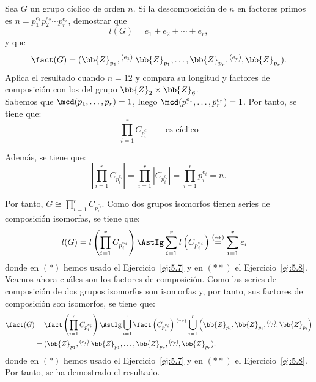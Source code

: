 \begin{ejercicio}\label{ej:5.9}
    Sea $G$ un grupo cíclico de orden $n$. Si la descomposición de $n$ en factores primos es $n = p_1^{e_1} p_2^{e_2} \cdots p_r^{e_r}$, demostrar que
    \[
        l(G) = e_1 + e_2 + \cdots + e_r,
    \]
    y que
    \[
        \fact(G) = (\bb{Z}_{p_1}, \stackrel{(e_1)}{\ldots}\bb{Z}_{p_1}, \dots, \bb{Z}_{p_r},\stackrel{(e_r)}{\ldots}, \bb{Z}_{p_r}).
    \]
    Aplica el resultado cuando $n = 12$ y compara su longitud y factores de composición con los del grupo $\bb{Z}_2 \times \bb{Z}_6$.\\

    Sabemos que $\mcd(p_1,\dots,p_r)=1$, luego $\mcd(p_1^{e_1},\dots,p_r^{e_r})=1$. Por tanto, se tiene que:
    \begin{equation*}
        \prod_{i=1}^{r} C_{p_i^{e_i}}\qquad \text{es cíclico}
    \end{equation*}

    Además, se tiene que:
    \begin{equation*}
        \left|\prod_{i=1}^{r} C_{p_i^{e_i}}\right| = \prod_{i=1}^{r} |C_{p_i^{e_i}}| = \prod_{i=1}^{r} p_i^{e_i} = n.
    \end{equation*}

    Por tanto, $G\cong \prod_{i=1}^{r} C_{p_i^{e_i}}$. Como dos grupos isomorfos tienen series de composición isomorfas, se tiene que:
    \begin{align*}
        l(G) &= l\left(\prod_{i=1}^{r} C_{p_i^{e_i}}\right) 
        \AstIg \sum_{i=1}^{r} l\left(C_{p_i^{e_i}}\right) 
        \stackrel{(\ast\ast)}{=} \sum_{i=1}^{r} e_i
    \end{align*}
    donde en $(\ast)$ hemos usado el Ejercicio~\ref{ej:5.7} y en $(\ast\ast)$ el Ejercicio~\ref{ej:5.8}.\\

    Veamos ahora cuáles son los factores de composición. Como las series de composición de dos grupos isomorfos son isomorfas y, por tanto, sus factores de composición son isomorfos, se tiene que:
    \begin{align*}
        \fact(G) &= \fact\left(\prod_{i=1}^{r} C_{p_i^{e_i}}\right) 
        \AstIg \bigcup_{i=1}^{r} \fact\left(C_{p_i^{e_i}}\right) 
        \stackrel{(\ast\ast)}{=} \bigcup_{i=1}^{r} \left(\bb{Z}_{p_i}, \bb{Z}_{p_i}, \stackrel{(e_i)}{\ldots}, \bb{Z}_{p_i}\right)\\
        &= (\bb{Z}_{p_1}, \stackrel{(e_1)}{\ldots}\bb{Z}_{p_1}, \dots, \bb{Z}_{p_r},\stackrel{(e_r)}{\ldots}, \bb{Z}_{p_r}).
    \end{align*}
    donde en $(\ast)$ hemos usado el Ejercicio~\ref{ej:5.7} y en $(\ast\ast)$ el Ejercicio~\ref{ej:5.8}. Por tanto, se ha demostrado el resultado.\\


\end{ejercicio}
